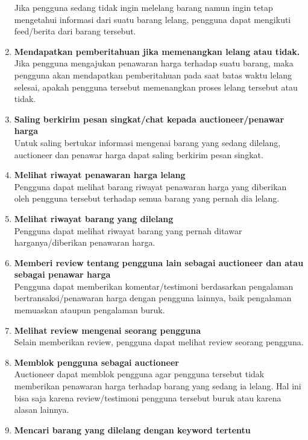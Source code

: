 \begin{enumerate}
	Jika pengguna sedang tidak ingin melelang barang namun ingin tetap mengetahui informasi dari suatu barang lelang, pengguna dapat mengikuti feed/berita dari barang tersebut.
	\item \textbf{Mendapatkan pemberitahuan jika memenangkan lelang atau tidak.}\\
	Jika pengguna mengajukan penawaran harga terhadap suatu barang, maka pengguna akan mendapatkan pemberitahuan pada saat batas waktu lelang selesai, apakah pengguna tersebut memenangkan proses lelang tersebut atau tidak.
	\item \textbf{Saling berkirim pesan singkat/chat kepada auctioneer/penawar harga }\\
	Untuk saling bertukar informasi mengenai barang yang sedang dilelang, auctioneer dan penawar harga dapat saling berkirim pesan singkat.
	\item \textbf{Melihat riwayat penawaran harga lelang }\\
	Pengguna dapat melihat barang riwayat penawaran harga yang diberikan oleh pengguna tersebut terhadap semua barang yang pernah dia lelang.
	\item \textbf{Melihat riwayat barang yang dilelang }\\
	Pengguna dapat melihat riwayat barang yang pernah ditawar harganya/diberikan penawaran harga.
	\item \textbf{Memberi review tentang pengguna lain sebagai auctioneer dan atau sebagai penawar harga }\\
	Pengguna dapat memberikan komentar/testimoni berdasarkan pengalaman bertransaksi/penawaran harga dengan pengguna lainnya, baik pengalaman memuaskan ataupun pengalaman buruk.
	\item\textbf{ Melihat review mengenai seorang pengguna }\\
	Selain memberikan review, pengguna dapat melihat review seorang pengguna.
	\item \textbf{Memblok pengguna sebagai auctioneer }\\
	Auctioneer dapat memblok pengguna agar pengguna tersebut tidak memberikan penawaran harga terhadap barang yang sedang ia lelang. Hal ini bisa saja karena review/testimoni pengguna tersebut buruk atau karena alasan lainnya.
	\item \textbf{Mencari barang yang dilelang dengan keyword tertentu}
\end{enumerate}